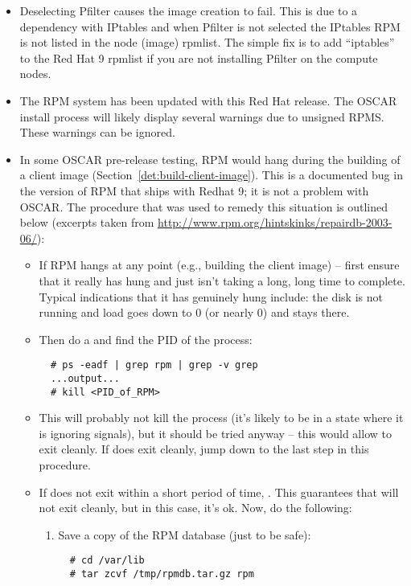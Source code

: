 \begin{itemize}

\item Deselecting Pfilter causes the image creation to fail.  This is
  due to a dependency with IPtables and when Pfilter is not selected
  the IPtables RPM is not listed in the node (image) rpmlist.   The simple
  fix is to add ``iptables'' to the Red Hat 9 rpmlist if you are not
  installing Pfilter on the compute nodes.

\item The RPM system has been updated with this Red Hat release.  The
 OSCAR install process will likely display several warnings due to unsigned
 RPMS.  These warnings can be ignored.

\item In some OSCAR pre-release testing, RPM would hang during the
  building of a client image (Section~\ref{det:build-client-image}).
  This is a documented bug in the version of RPM that ships with
  Redhat 9; it is not a problem with OSCAR.  The procedure
  that was used to remedy this situation is outlined below (excerpts
  taken from \url{http://www.rpm.org/hintskinks/repairdb-2003-06/}):
        \begin{itemize}
        \item If RPM hangs at any point (e.g., building the client
          image) -- first ensure that it really has hung and just
          isn't taking a long, long time to complete.  Typical
          indications that it has genuinely hung include: the disk is
          not running and load goes down to 0 (or nearly 0) and stays
          there.

        \item Then do a  and find the PID of the 
          process:
\begin{verbatim}
  # ps -eadf | grep rpm | grep -v grep
  ...output...
  # kill <PID_of_RPM>
\end{verbatim}

        \item This will probably not kill the process (it's likely to
          be in a state where it is ignoring signals), but it should
          be tried anyway -- this would allow  to exit
          cleanly.  If  does exit cleanly, jump down to the
          last step in this procedure.

        \item If  does not exit within a short period of
          time, .  This guarantees that
           will not exit cleanly, but in this case, it's ok.
          Now, do the following:
                        \begin{enumerate}
                        \item Save a copy of the RPM database (just to
                          be safe):
\begin{verbatim}
  # cd /var/lib
  # tar zcvf /tmp/rpmdb.tar.gz rpm
\end{verbatim}


\end{enumerate}
\end{itemize}
\end{itemize}
